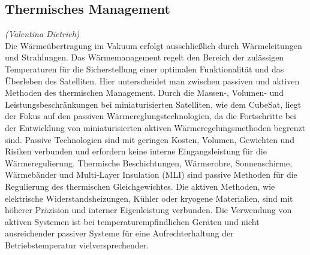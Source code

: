 		\subsection{Thermisches Management}%
		\hfill\emph{(Valentina Dietrich)}\\
Die Wärmeübertragung im Vakuum erfolgt ausschließlich durch Wärmeleitungen und Strahlungen. Das Wärmemanagement regelt den Bereich der zulässigen Temperaturen für die Sicherstellung einer optimalen Funktionalität und das Überleben des Satelliten. Hier unterscheidet man zwischen passiven und aktiven Methoden des thermischen Management.  Durch die Massen-, Volumen- und Leistungsbeschränkungen bei miniaturisierten Satelliten, wie dem CubeSat, liegt der Fokus auf den passiven Wärmereglungstechnologien, da die Fortschritte bei der Entwicklung von miniaturisierten aktiven Wärmeregelungsmethoden begrenzt sind. Passive Technologien sind mit geringen Kosten, Volumen, Gewichten und Risiken verbunden und erfordern keine interne Eingangsleistung für die Wärmeregulierung. Thermische Beschichtungen, Wärmerohre, Sonnenschirme, Wärmebänder und Multi-Layer Insulation (MLI) sind passive Methoden für die Regulierung des thermischen Gleichgewichtes. Die aktiven Methoden, wie elektrische Widerstandsheizungen, Kühler oder kryogene Materialien, sind mit höherer Präzision und interner Eigenleistung verbunden. Die Verwendung von aktiven Systemen ist bei temperaturempfindlichen Geräten und nicht ausreichender passiver Systeme für eine Aufrechterhaltung der Betriebstemperatur vielversprechender. \cite[S. 109 - 120]{NASA.Sota.2018} 

